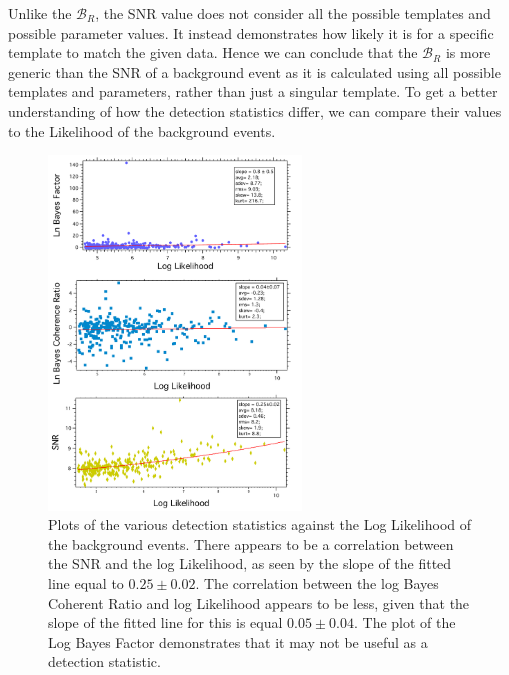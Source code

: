 \documentclass{article}
\begin{document}
 
 Unlike the $\mathcal{B}_{R}$, the SNR value does not consider all the possible templates and possible parameter values. It instead demonstrates how likely it is for a specific template to match the given data. Hence we can conclude that the $\mathcal{B}_{R}$ is more generic than the SNR of a background event as it is calculated using all possible templates and parameters, rather than just a singular template. To get a better understanding of how the detection statistics differ, we can compare their values to the Likelihood of the background events.\\
       
       
       \begin{figure}[h]
       	\centering
       	\includegraphics[width=0.6\textwidth]{Figures/DetectionStatisticComparison.pdf} 
       	\caption{Plots of the various detection statistics against the Log Likelihood of the background events. There appears to be a correlation between the SNR and the log Likelihood, as seen by the slope of the fitted line equal to $0.25\pm0.02$. The correlation between the log Bayes Coherent Ratio and log Likelihood appears to be less, given that the slope of the fitted line for this is equal $0.05\pm0.04$. The plot of the Log Bayes Factor demonstrates that it may not be useful as a detection statistic.}
       	\label{Fig:SeparateDetectionStatisticVSlnL}
       \end{figure}
                
                
                
\end{document}
